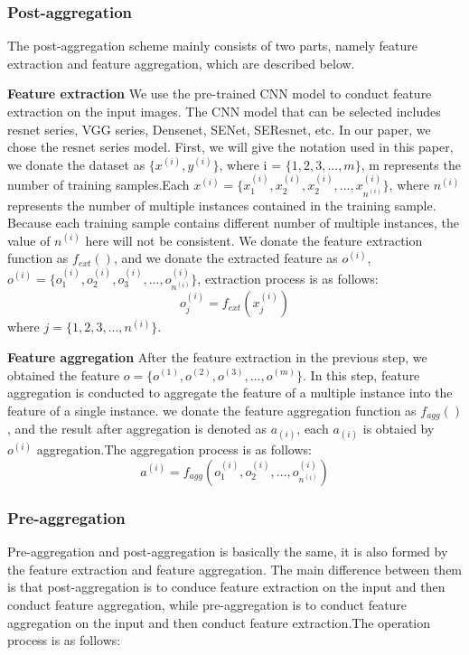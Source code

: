 \documentclass[10pt,twocolumn,letterpaper]{article}
\begin{document}
\subsubsection{Post-aggregation}
The post-aggregation scheme mainly consists of two parts, namely feature extraction and feature aggregation, which are described below.

\textbf{Feature extraction}
We use the pre-trained CNN model to conduct feature extraction on the input images. The CNN model that can be selected includes resnet series, VGG series, Densenet, SENet, SEResnet, etc. In our paper, we chose the resnet series model. First, we will give the notation used in this paper, we donate the dataset as $\{x^{(i)}, y^{(i)}\}$, where i = $\{1,2,3,...,m\}$, m represents the number of training samples.Each $x^{(i)} = \{x^{(i)}_1, x^{(i)}_2, x^{(i)}_2,..., x^{(i)}_{n^{(i)}}\}$, where $n^{(i)}$ represents the number of multiple instances contained in the training sample. Because each training sample contains different number of multiple instances, the value of $n^{(i)}$ here will not be consistent. We donate the feature extraction function as $f_{ext}()$, and we donate the extracted feature as $o^{(i)}$, $o^{(i)} = \{o^{(i)}_1, o^{(i)}_2, o^{(i)}_3, ... ,o^{(i)}_{n^{(i)}}\}$, extraction process is as follows:
\begin{equation}
    o^{(i)}_j = f_{ext}(x^{(i)}_j)
\end{equation}
where $j = \{1,2,3,...,n^{(i)}\}$.

\textbf{Feature aggregation}
After the feature extraction in the previous step, we obtained the feature $o = \{o^{(1)}, o^{(2)}, o^{(3)}, ..., o^{(m)}\}$. In this step, feature aggregation is conducted to aggregate the feature of a multiple instance into the feature of a single instance. we donate the feature aggregation function as $f_{agg}()$, and the result after aggregation is denoted as $a_{(i)}$, each $a_{(i)}$ is obtaied by $o^{(i)}$ aggregation.The aggregation process is as follows:
\begin{equation}
    a^{(i)} = f_{agg}(o^{(i)}_1, o^{(i)}_2, ..., o^{(i)}_{n^{(i)}})
\end{equation}

\subsubsection{Pre-aggregation}
Pre-aggregation and post-aggregation is basically the same, it is also formed by the feature extraction and feature aggregation. The main difference between them is that post-aggregation is to conduce feature extraction on the input and then conduct feature aggregation, while pre-aggregation is to conduct feature aggregation on the input and then conduct feature extraction.The operation process is as follows:
\end{document}
